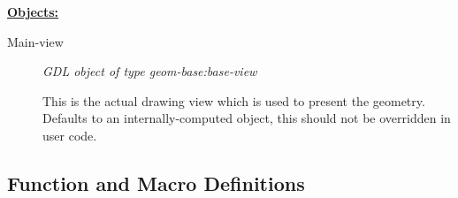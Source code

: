 \documentclass [11pt]{book}
\begin{document}
\begin{itemize}
\begin{description}
\end{description}






\textbf{
\underline{Objects:}}

\begin{description}

\item [Main-view]
\emph{GDL object of type geom-base:base-view}

 This is the actual drawing view which is used to present the geometry. Defaults to an
internally-computed object, this should not be overridden in user code.




\end{description}







\end{itemize}



\subsection{Function and Macro Definitions}

\label{subsec:functionandmacrodefinitions}
\end{document}
